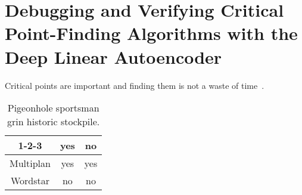 \documentclass[../../thesis.tex]{subfiles}
\begin{document}
\chapter{Debugging and Verifying Critical Point-Finding Algorithms with the Deep Linear Autoencoder}

Critical points are important and finding them is not a waste of time~\cite{pennington2017}.

\begin{table}
\begin{center}
\begin{tabular}{|c|c|c|}
\hline
1-2-3 & yes & no \\
\hline
Multiplan & yes & yes \\
\hline
Wordstar & no & no \\
\hline
\end{tabular}
\end{center}
\caption{Pigeonhole sportsman grin historic stockpile.}
\end{table}

\onlyinsubfile{\printbibliography}
\end{document}
